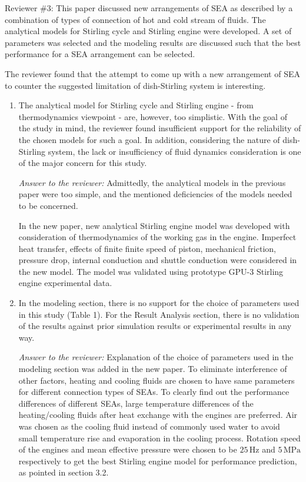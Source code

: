 \documentclass[12pt]{letter}
\begin{document}
\newpage
Reviewer \#3:  This paper discussed new arrangements of SEA as described by a combination of types of connection of hot and cold stream of fluids. The analytical models for Stirling cycle and Stirling engine were developed. A set of parameters was selected and the modeling results are discussed such that the best performance for a SEA arrangement can be selected.

The reviewer found that the attempt to come up with a new arrangement of SEA to counter the suggested limitation of dish-Stirling system is interesting. 

\begin{enumerate}

\item The analytical model for Stirling cycle and Stirling engine - from thermodynamics viewpoint - are, however, too simplistic. With the goal of the study in mind, the reviewer found insufficient support for the reliability of the chosen models for such a goal. In addition, considering the nature of dish-Stirling system, the lack or insufficiency of  fluid dynamics consideration is one of the major concern for this study. 

\begin{snugshade*}
\emph{Answer to the reviewer:} 
Admittedly, the analytical models in the previous paper were too simple, and the mentioned deficiencies of the models needed to be concerned.

In the new paper, new analytical Stirling engine model was developed with consideration of thermodynamics of the working gas in the engine. Imperfect heat transfer, effects of finite finite speed of piston, mechanical friction, pressure drop, internal conduction and shuttle conduction were considered in the new model. The model was validated using prototype GPU-3 Stirling engine experimental data.
\end{snugshade*}

\item In the modeling section, there is no support for the choice of parameters used in this study (Table 1). For the Result Analysis section, there is no validation of the results against prior simulation results or experimental results in any way. 

\begin{snugshade*}
\emph{Answer to the reviewer:} 
Explanation of the choice of parameters used in the modeling section was added in the new paper. To eliminate interference of other factors, heating and cooling fluids are chosen to have same parameters for different connection types of SEAs. To clearly find out the performance differences of different SEAs, large temperature differences of the heating/cooling fluids after heat exchange with the engines are preferred. Air was chosen as the cooling fluid instead of commonly used water to avoid small temperature rise and evaporation in the cooling process. Rotation speed of the engines and mean effective pressure were chosen to be $25\,\mathrm{Hz}$ and $5\,\mathrm{MPa}$ respectively to get the best Stirling engine model for performance prediction, as pointed in section 3.2.


\end{snugshade*}
\end{enumerate}
\end{document}

